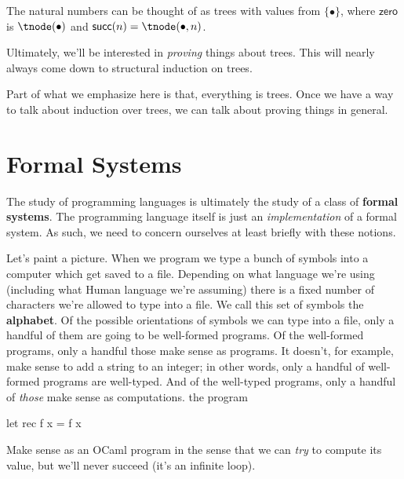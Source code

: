 \begin{example}
  The natural numbers can be thought of as trees with values from $\{\bullet\}$, where $\mathsf{zero}$ is $\tnode(\bullet)$ and $\mathsf{succ}(n) = \tnode(\bullet, n)$.
\end{example}


Ultimately, we'll be interested in \textit{proving} things about trees.
This will nearly always come down to structural induction on trees.

Part of what we emphasize here is that, everything is trees.
Once we have a way to talk about induction over trees, we can talk about proving things in general.

\section{Formal Systems}

The study of programming languages is ultimately the study of a class of \textbf{formal systems}.
The programming language itself is just an \textit{implementation} of a formal system.
As such, we need to concern ourselves at least briefly with these notions.

Let's paint a picture.
When we program we type a bunch of symbols into a computer which get saved to a file.
Depending on what language we're using (including what Human language we're assuming) there is a fixed number of characters we're allowed to type into a file.
We call this set of symbols the \textbf{alphabet}.
Of the possible orientations of symbols we can type into a file, only a handful of them are going to be well-formed programs.
Of the well-formed programs, only a handful those make sense as programs.
It doesn't, for example, make sense to add a string to an integer; in other words, only a handful of well-formed programs are well-typed.
And of the well-typed programs, only a handful of \textit{those} make sense as computations.
the program
\begin{ocaml}
  let rec f x = f x
\end{ocaml}
Make sense as an OCaml program in the sense that we can \textit{try} to compute its value, but we'll never succeed (it's an infinite loop).


